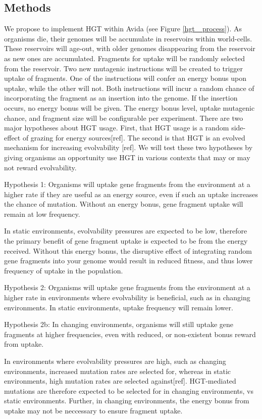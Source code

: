 \subsection{Methods}
We propose to implement HGT within Avida (see Figure \ref{hgt_ process}). As organisms die, their genomes will be accumulate in reservoirs within world-cells. These reservoirs will age-out, with older genomes disappearing from the reservoir as new ones are accumulated. Fragments for uptake will be randomly selected from the reservoir. Two new mutagenic instructions will be created to trigger uptake of fragments. One of the instructions will confer an energy bonus upon uptake, while the other will not. Both instructions will incur a random chance of incorporating the fragment as an insertion into the genome. If the insertion occurs, no energy bonus will be given. The energy bonus level, uptake mutagenic chance, and fragment size will be configurable per experiment.
There are two major hypotheses about HGT usage. First, that HGT usage is a random side-effect of grazing for energy sources[ref]. The second is that HGT is an evolved mechanism for increasing evolvability [ref]. We will test these two hypotheses by giving organisms an opportunity use HGT in various contexts that may or may not reward evolvability.


Hypothesis 1: Organisms will uptake gene fragments from the environment at a higher rate if they are useful as an energy source, even if such an uptake increases the chance of mutation. Without an energy bonus, gene fragment uptake will remain at low frequency.


In static environments, evolvability pressures are expected to be low, therefore the primary benefit of gene fragment uptake is expected to be from the energy received. Without this energy bonus, the disruptive effect of integrating random gene fragments into your genome would result in reduced fitness, and thus lower frequency of uptake in the population.


Hypothesis 2: Organisms will uptake gene fragments from the environment at a higher rate in environments where evolvability is beneficial, such as in changing environments. In static environments, uptake frequency will remain lower.


Hypothesis 2b: In changing environments, organisms will still uptake gene fragments at higher frequencies, even with reduced, or non-existent bonus reward from uptake.


In environments where evolvability pressures are high, such as changing environments, increased mutation rates are selected for, whereas in static environments, high mutation rates are selected against[ref]. HGT-mediated mutations are therefore expected to be selected for in changing environments, vs static environments. Further, in changing environments, the energy bonus from uptake may not be neccessary to ensure fragment uptake.


